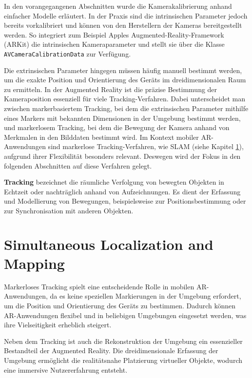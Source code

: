 In den vorangegangenen Abschnitten wurde die Kamerakalibrierung anhand einfacher Modelle erläutert. In der Praxis sind die intrinsischen Parameter jedoch bereits vorkalibriert und können von den Herstellern der Kameras bereitgestellt werden. So integriert zum Beispiel Apples Augmented-Reality-Framework (ARKit) die intrinsischen Kameraparameter und stellt sie über die Klasse \texttt{AVCameraCalibrationData} zur Verfügung. \cite{appledevdoc}

Die extrinsischen Parameter hingegen müssen häufig manuell bestimmt werden, um die exakte Position und Orientierung des Geräts im dreidimensionalen Raum zu ermitteln. In der Augmented Reality ist die präzise Bestimmung der Kameraposition essenziell für viele Tracking-Verfahren. Dabei unterscheidet man zwischen markerbasiertem Tracking, bei dem die extrinsischen Parameter mithilfe eines Markers mit bekannten Dimensionen in der Umgebung bestimmt werden, und markerlosem Tracking, bei dem die Bewegung der Kamera anhand von Merkmalen in den Bilddaten bestimmt wird. Im Kontext mobiler AR-Anwendungen sind markerlose Tracking-Verfahren, wie SLAM (siehe Kapitel \ref{SLAM}), aufgrund ihrer Flexibilität besonders relevant. Deswegen wird der Fokus in den folgenden Abschnitten auf diese Verfahren gelegt. \cite{doerner2022virtual, alam2024calibration}

\begin{tcolorbox}[colback=THAi-Blue!20!white, colframe=THAi-Blue]
    \textbf{Tracking} bezeichnet die räumliche Verfolgung von bewegten Objekten in Echtzeit oder nachträglich anhand von Aufzeichnungen. Es dient der Erfassung und Modellierung von Bewegungen, beispielsweise zur Positionsbestimmung oder zur Synchronisation mit anderen Objekten. \cite{wikipedia2024tracking}
\end{tcolorbox}  

\section{Simultaneous Localization and Mapping}\label{SLAM}

Markerloses Tracking spielt eine entscheidende Rolle in mobilen AR-Anwendungen, da es keine speziellen Markierungen in der Umgebung erfordert, um die Position und Orientierung des Geräts zu bestimmen. Dadurch können AR-Anwendungen flexibel und in beliebigen Umgebungen eingesetzt werden, was ihre Vielseitigkeit erheblich steigert. \cite{doerner2022virtual}

Neben dem Tracking ist auch die Rekonstruktion der Umgebung ein essenzieller Bestandteil der Augmented Reality. Die dreidimensionale Erfassung der Umgebung ermöglicht die realitätsnahe Platzierung virtueller Objekte, wodurch eine immersive Nutzererfahrung entsteht. \cite{doerner2022virtual}

